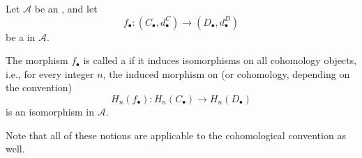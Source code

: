 
\begin{definition} \label{definition:quasi_isomorphism_of_chain_complexes_of_objects_in_an_abelian_category}
    Let $\mathcal{A}$ be an , and let
    \[
    f_\bullet: (C_\bullet, d_\bullet^C) \to (D_\bullet, d_\bullet^D)
    \]
    be a  in $\mathcal{A}$.

    The morphism $f_\bullet$ is called a  if it induces isomorphisms on all cohomology objects, i.e., for every integer $n$, the induced morphism on  (or cohomology, depending on the convention)
    \[
    H_n(f_\bullet): H_n(C_\bullet) \to H_n(D_\bullet)
    \]
    is an isomorphism in $\mathcal{A}$.

    Note that all of these notions are applicable to the cohomological convention as well.
\end{definition}
